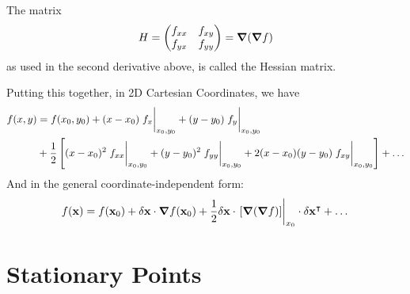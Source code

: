 \documentclass{article}
\begin{document}
The matrix
\[ H = \begin{pmatrix}
        f_{xx} & f_{xy} \\
        f_{yx} & f_{yy}
    \end{pmatrix} = \grad(\grad f) \]
as used in the second derivative above, is called the Hessian matrix.

Putting this together, in 2D Cartesian Coordinates, we have
\begin{align*}
    f(x, y) & = f(x_0, y_0) + (x-x_0)\eval{f_x}_{x_0, y_0} + (y-y_0)\eval{f_y}_{x_0, y_0} \\&+ \frac{1}{2}\left[ (x-x_0)^2\eval{f_{xx}}_{x_0, y_0} + (y-y_0)^2\eval{f_{yy}}_{x_0, y_0} + 2(x-x_0)(y-y_0)\eval{f_{xy}}_{x_0, y_0} \right] + \dots
\end{align*}
And in the general coordinate-independent form:
\[ f(\vb x) = f(\vb x_0) + \delta \vb x \cdot \grad f(\vb x_0) + \frac{1}{2}\delta \vb x \cdot \eval{[\grad (\grad f)]}_{x_0} \cdot \delta \vb x^\transpose + \dots \]

\section{Stationary Points}
\end{document}
